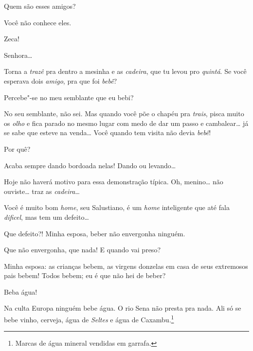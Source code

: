  Quem
são esses amigos?

 Você não conhece eles.

  Zeca!

  
Senhora\ldots{} 

 Torna a
\textit{trazê} pra dentro a mesinha e as
\textit{cadeira}, que tu levou pro
\textit{quintá}.  Se
você esperava dois \textit{amigo},
pra que foi \textit{bebê}?

 
Percebe"-se no meu semblante que eu bebi?

 No seu
semblante, não sei. Mas quando você põe o
chapéu pra \textit{trais}, pisca muito os
\textit{olho} e fica parado no mesmo lugar com medo
de dar um passo e cambalear\ldots{} já se sabe que esteve
na venda\ldots{} Você quando tem visita não
devia \textit{bebê}!

 Por
quê?

 Acaba sempre dando bordoada
nelas! Dando ou levando\ldots{}

 Hoje não haverá
motivo para essa demonstração típica.
 Oh,
menino\ldots{} não ouviste\ldots{} traz as
\textit{cadeira}\ldots{}

 Você é muito
bom \textit{home}, seu Salustiano, é um
\textit{home} inteligente que até
fala \textit{dificel}, mas tem um
defeito\ldots{}

 Que defeito?!
Minha esposa, beber não envergonha ninguém.

 Que
não envergonha, que nada! E quando vai preso?

 Minha esposa:
as crianças bebem, as virgens donzelas em casa de
seus extremosos pais bebem! Todos bebem; eu é que
não hei de beber?

 Beba
água!

 Na culta Europa
ninguém bebe água. O rio Sena não
presta pra nada. Ali só se bebe vinho,
cerveja, água de \textit{Seltes} e
água de Caxambu.\footnote{ 
Marcas de água mineral vendidas em garrafa.}




